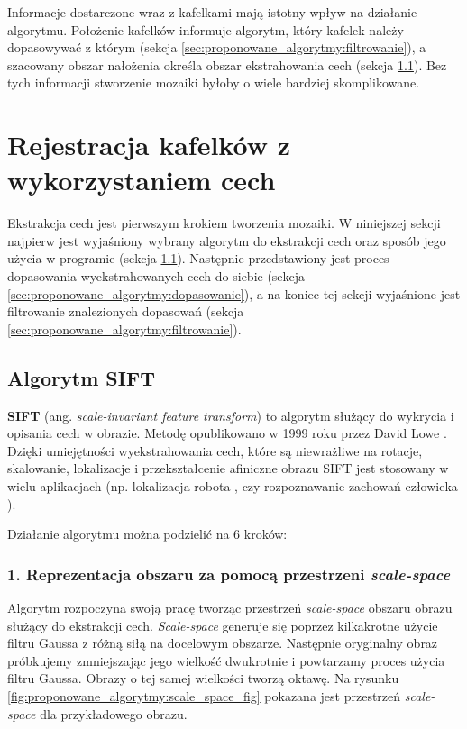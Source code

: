 Informacje dostarczone wraz z kafelkami mają istotny wpływ na działanie algorytmu. Położenie kafelków informuje algorytm, który kafelek należy dopasowywać z którym (sekcja \ref{sec:proponowane_algorytmy:filtrowanie}), a szacowany obszar nałożenia określa obszar ekstrahowania cech (sekcja \ref{sec:proponowane_algorytmy:sift}). Bez tych informacji stworzenie mozaiki byłoby o wiele bardziej skomplikowane.

\section{Rejestracja kafelków z wykorzystaniem cech}
\label{sec:proponowane_algorytmy:cechy}

Ekstrakcja cech jest pierwszym krokiem tworzenia mozaiki. W niniejszej sekcji najpierw jest wyjaśniony wybrany algorytm do ekstrakcji cech oraz sposób jego użycia w programie (sekcja \ref{sec:proponowane_algorytmy:sift}). Następnie przedstawiony jest proces dopasowania wyekstrahowanych cech do siebie (sekcja \ref{sec:proponowane_algorytmy:dopasowanie}), a na koniec tej sekcji wyjaśnione jest filtrowanie znalezionych dopasowań (sekcja \ref{sec:proponowane_algorytmy:filtrowanie}).

\subsection{Algorytm SIFT}
\label{sec:proponowane_algorytmy:sift}

\textbf{SIFT} (ang. \textit{scale-invariant feature transform}) to algorytm służący do wykrycia i opisania cech w obrazie. Metodę opublikowano w 1999 roku przez David Lowe \cite{Lowe:2004:DIF:993451.996342}. Dzięki umiejętności wyekstrahowania cech, które są niewrażliwe na rotacje, skalowanie, lokalizacje i przekształcenie afiniczne obrazu SIFT jest stosowany w wielu aplikacjach (np. lokalizacja robota \cite{conf/icra/2001}, czy rozpoznawanie zachowań człowieka \cite{Laptev:2007:LVM:1314710.1314906}).

Działanie algorytmu można podzielić na 6 kroków:

\subsubsection{1. Reprezentacja obszaru za pomocą przestrzeni \textit{scale-space}}
\label{sec:proponowane_algorytmy:scale_space}

Algorytm rozpoczyna swoją pracę tworząc przestrzeń \textit{scale-space} obszaru obrazu służący do ekstrakcji cech. \textit{Scale-space} generuje się poprzez kilkakrotne użycie filtru Gaussa z różną siłą na docelowym obszarze. Następnie oryginalny obraz próbkujemy zmniejszając jego wielkość dwukrotnie i powtarzamy proces użycia filtru Gaussa. Obrazy o tej samej wielkości tworzą oktawę. Na rysunku \ref{fig:proponowane_algorytmy:scale_space_fig} pokazana jest przestrzeń \textit{scale-space} dla przykładowego obrazu.

